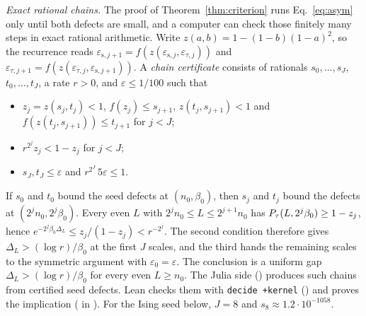 \documentclass[aps,prl,reprint,amsmath,amssymb,nofootinbib,raggedbottom]{revtex4-2}
\begin{document}
\emph{Exact rational chains.}
The proof of Theorem~\ref{thm:criterion} runs Eq.~\eqref{eq:asym} only until
both defects are small, and a computer can check those finitely many steps in
exact rational arithmetic. Write $z(a,b)=1-(1-b)(1-a)^2$, so the recurrence
reads $\varepsilon_{\mathrm s,j+1}=f(z(\varepsilon_{\mathrm s,j},\varepsilon_{\tau,j}))$
and $\varepsilon_{\tau,j+1}=f(z(\varepsilon_{\tau,j},\varepsilon_{\mathrm s,j+1}))$.
A \emph{chain certificate} consists of rationals $s_0,\dots,s_J$,
$t_0,\dots,t_J$, a rate $r>0$, and $\varepsilon\le1/100$ such that
\begin{itemize}
\item $z_j=z(s_j,t_j)<1$, $f(z_j)\le s_{j+1}$, $z(t_j,s_{j+1})<1$ and
$f(z(t_j,s_{j+1}))\le t_{j+1}$ for $j<J$;
\item $r^{2^j}z_j<1-z_j$ for $j<J$;
\item $s_J,t_J\le\varepsilon$ and $r^{2^J}\,5\varepsilon\le1$.
\end{itemize}
If $s_0$ and $t_0$ bound the seed defects at $(n_0,\beta_0)$, then $s_j$ and
$t_j$ bound the defects at $(2^jn_0,2^j\beta_0)$. Every even $L$ with
$2^jn_0\le L\le2^{j+1}n_0$ has $P_{\tau}(L,2^j\beta_0)\ge1-z_j$, hence
$e^{-2^j\beta_0\Delta_L}\le z_j/(1-z_j)<r^{-2^j}$. The second condition
therefore gives $\Delta_L>(\log r)/\beta_0$ at the first $J$ scales, and the
third hands the remaining scales to the symmetric argument with
$\varepsilon_0=\varepsilon$. The conclusion is a uniform gap
$\Delta_L>(\log r)/\beta_0$ for every even $L\ge n_0$. The Julia side
() produces such chains from
certified seed defects. Lean checks them with \texttt{decide +kernel}
() and proves the implication
( in ).
For the Ising seed below, $J=8$ and $s_8\approx1.2\cdot10^{-1058}$.
\end{document}
